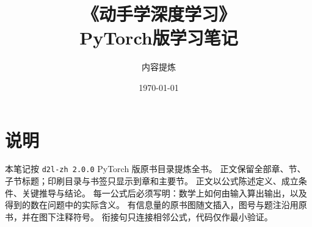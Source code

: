 \documentclass[UTF8,zihao=-4,openany]{ctexbook}
\title{\heiti 《动手学深度学习》\\[0.4em]\Large PyTorch版学习笔记}
\author{内容提炼}
\date{\today}
\begin{document}
\maketitle
\frontmatter

\chapter*{说明}
本笔记按 \texttt{d2l-zh 2.0.0} PyTorch 版原书目录提炼全书。
正文保留全部章、节、子节标题；印刷目录与书签只显示到章和主要节。
正文以公式陈述定义、成立条件、关键推导与结论。
每一公式后必须写明：数学上如何由输入算出输出，以及得到的数在问题中的实际含义。
有信息量的原书图随文插入，图号与题注沿用原书，并在图下注释符号。
衔接句只连接相邻公式，代码仅作最小验证。

\hypertarget{contents}{}
\tableofcontents





\mainmatter
















\appendix

\end{document}
